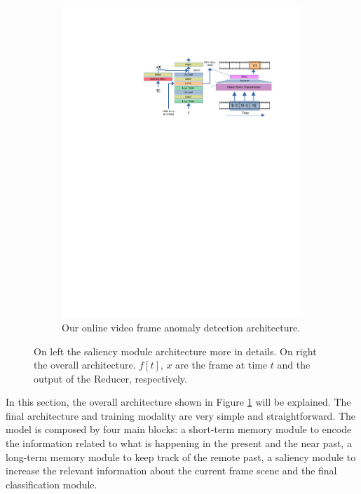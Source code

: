 \begin{figure}[!ht]
\begin{subfigure}{0.7\linewidth}
            \includegraphics[trim=205 500 80 130, clip, width=1.\linewidth]{images/arch.pdf}
        \caption{Our online video frame anomaly detection architecture.}
		\label{fig:arch}
	\end{subfigure}
	\caption{On left the saliency module architecture more in details. On right the overall architecture. $f[t]$, $x$ are the frame at time $t$ and the output of the Reducer, respectively.}
	\label{fig:our-arch}
\end{figure}

In this section, the overall architecture shown in Figure \ref{fig:arch} will be explained.
The final architecture and training modality are very simple and straightforward.
The model is composed by four main blocks: a short-term memory module to encode the information related to what is happening in the present and the near past, a long-term memory module to keep track of the remote past, a saliency module to increase the relevant information about the current frame scene and the final classification module.

